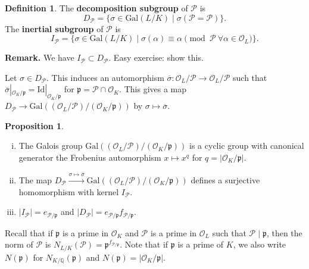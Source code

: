 \documentclass{article}
\theoremstyle{definition}
\newtheorem{prop}[theorem]{Proposition}
\newtheorem{defn}{Definition}[section]
\begin{document}
\begin{defn}
    The \textbf{decomposition subgroup} of $\mathcal{P}$ is $$D_{\mathcal{P}} = \{\sigma \in \text{Gal}(L/K) \mid \sigma(\mathcal{P}=\mathcal{P})\}.$$
    The \textbf{inertial subgroup} of $\mathcal{P}$ is \[
    I_{\mathcal{P}} = \{\sigma \in \text{Gal}(L/K) \mid \sigma(\alpha) \equiv \alpha \pmod{\mathcal{P} ~\forall \alpha \in \mathcal{O}_L}\}.
    \]
\end{defn}
\textbf{Remark.} We have $I_{\mathcal{P}} \subset D_{\mathcal{P}}$. Easy exercise: show this.
\vspace{1mm}
 
Let $\sigma \in D_\mathcal{P}$. This induces an automorphism $\overline{\sigma} : \mathcal{O}_L/\mathcal{P} \to \mathcal{O}_L/\mathcal{P}$ such that $\overline{\sigma}|_{\mathcal{O}_K/\mathfrak{p}} = \text{Id}|_{\mathcal{O}_K/\mathfrak{p}}$ for $\mathfrak{p} = \mathcal{P} \cap \mathcal{O}_K$. This gives a map $D_{\mathcal{P}} \to \text{Gal}((\mathcal{O}_L/\mathcal{P})/ (\mathcal{O}_K/\mathfrak{p}))$ by $\sigma \mapsto \overline{\sigma}$.

\begin{prop}\label{prop0.1}
    \begin{enumerate}[(i)]
        \item The Galois group $\text{Gal}((\mathcal{O}_L/\mathcal{P})/ (\mathcal{O}_K/\mathfrak{p}))$ is a cyclic group with canonical generator the Frobenius automorphism $x \mapsto x^q$ for $q = |\mathcal{O}_K/\mathfrak{p}|$.
        \item The map $D_{\mathcal{P}} \stackrel{\sigma \mapsto \overline{\sigma}}{\to} \text{Gal}((\mathcal{O}_L/\mathcal{P})/ (\mathcal{O}_K/\mathfrak{p}))$ defines a surjective homomorphism with kernel $I_{\mathcal{P}}$.
        \item $|I_{\mathcal{P}}| = e_{\mathcal{P}/\mathfrak{p}}$ and $|D_{\mathcal{P}}| = e_{\mathcal{P}/\mathfrak{p}}f_{\mathcal{P}/\mathfrak{p}}$.
    \end{enumerate}
\end{prop}
Recall that if $\mathfrak{p}$ is a prime in $\mathcal{O}_K$ and $\mathcal{P}$ is a prime in $\mathcal{O}_L$ such that $\mathcal{P} \mid  \mathfrak{p}$, then the norm of $\mathcal{P}$ is $N_{L/K}(\mathcal{P}) = \mathfrak{p}^{f_{\mathcal{P}/\mathfrak{p}}}$. Note that if $\mathfrak{p}$ is a prime of $K$, we also write $N(\mathfrak{p})$ for $N_{K/\mathbb{Q}}(\mathfrak{p})$ and $N(\mathfrak{p}) = |\mathcal{O}_K/\mathfrak{p}|$.
\end{document}
